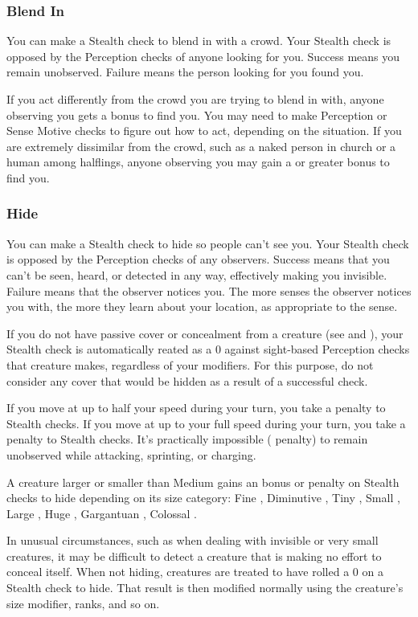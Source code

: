 \subsubsection{Blend In}
You can make a Stealth check to blend in with a crowd. Your Stealth check is opposed by the Perception checks of anyone looking for you. Success means you remain unobserved. Failure means the person looking for you found you.

If you act differently from the crowd you are trying to blend in with, anyone observing you gets a  bonus to find you. You may need to make Perception or Sense Motive checks to figure out how to act, depending on the situation. If you are extremely dissimilar from the crowd, such as a naked person in church or a human among halflings, anyone observing you may gain a  or greater bonus to find you. 

\subsubsection{Hide}
You can make a Stealth check to hide so people can't see you. Your Stealth check is opposed by the Perception checks of any observers. Success means that you can't be seen, heard, or detected in any way, effectively making you invisible. Failure means that the observer notices you. The more senses the observer notices you with, the more they learn about your location, as appropriate to the sense. 

If you do not have passive cover or concealment from a creature (see  and ), your Stealth check is automatically reated as a 0 against sight-based Perception checks that creature makes, regardless of your modifiers. For this purpose, do not consider any cover that would be hidden as a result of a successful check.

If you move at up to half your speed during your turn, you take a  penalty to Stealth checks. If you move at up to your full speed during your turn, you take a  penalty to Stealth checks. It's practically impossible ( penalty) to remain unobserved while attacking, sprinting, or charging.

A creature larger or smaller than Medium gains an bonus or penalty on Stealth checks to hide depending on its size category: Fine , Diminutive , Tiny , Small , Large , Huge , Gargantuan , Colossal .

 In unusual circumstances, such as when dealing with invisible or very small creatures, it may be difficult to detect a creature that is making no effort to conceal itself. When not hiding, creatures are treated to have rolled a 0 on a Stealth check to hide. That result is then modified normally using the creature's size modifier, ranks, and so on.

